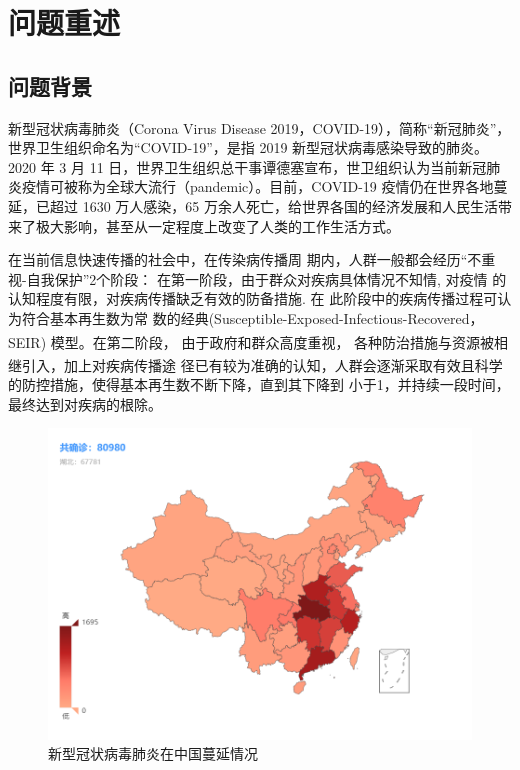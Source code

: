 \documentclass{whutmod}
\newcommand{\upcite}[1]{\textsuperscript{\cite{#1}}}
\begin{document}
	\thispagestyle{empty}
	\setcounter{page}{1}  
	\tableofcontents
	\newpage	%
	

	
	\section{问题重述}	
		\subsection{问题背景}
	    	新型冠状病毒肺炎（Corona Virus Disease 2019，COVID-19），简称“新冠肺炎”，世界卫生组织命名为“COVID-19”，是指 2019 新型冠状病毒感染导致的肺炎。2020 年 3 月 11 日，世界卫生组织总干事谭德塞宣布，世卫组织认为当前新冠肺炎疫情可被称为全球大流行（pandemic）。目前，COVID-19 疫情仍在世界各地蔓延，已超过 1630 万人感染，65 万余人死亡，给世界各国的经济发展和人民生活带来了极大影响，甚至从一定程度上改变了人类的工作生活方式。
	
	在当前信息快速传播的社会中，在传染病传播周
	期内，人群一般都会经历“不重视-自我保护”2个阶段：
	在第一阶段，由于群众对疾病具体情况不知情, 对疫情
	的认知程度有限，对疾病传播缺乏有效的防备措施. 在
	此阶段中的疾病传播过程可认为符合基本再生数为常
	数的经典(Susceptible-Exposed-Infectious-Recovered，SEIR)
模型\upcite{1}。在第二阶段， 由于政府和群众高度重视，
	各种防治措施与资源被相继引入\upcite{2}，加上对疾病传播途
	径已有较为准确的认知，人群会逐渐采取有效且科学
	的防控措施，使得基本再生数不断下降，直到其下降到
	小于1，并持续一段时间， 最终达到对疾病的根除。
	
		\begin{figure}[H]
		\centering
		\includegraphics[width=\textwidth]{figures/demo.png}
		\caption{新型冠状病毒肺炎在中国蔓延情况}\label{lsssct}
	\end{figure}
\end{document}
